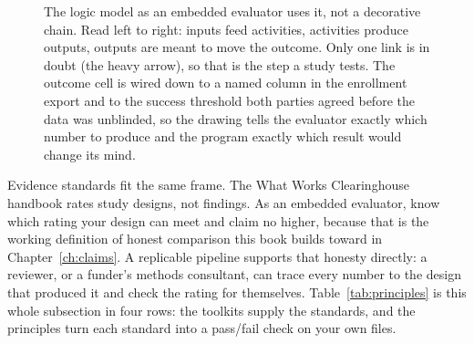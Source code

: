 \begin{figure}
\centering
{}
\caption[A logic model wired to a variable and a threshold]{The logic model as an embedded evaluator uses it, not a decorative chain. Read left to right: inputs feed activities, activities produce outputs, outputs are meant to move the outcome. Only one link is in doubt (the heavy arrow), so that is the step a study tests. The outcome cell is wired down to a named column in the enrollment export and to the success threshold both parties agreed before the data was unblinded, so the drawing tells the evaluator exactly which number to produce and the program exactly which result would change its mind.}
\label{fig:ch01-viz-logic}
\end{figure}

Evidence standards fit the same frame. The What Works Clearinghouse handbook \parencite{wwc2022handbook} rates study designs, not findings. As an embedded evaluator, know which rating your design can meet and claim no higher, because that is the working definition of honest comparison this book builds toward in Chapter~\ref{ch:claims}. A replicable pipeline supports that honesty directly: a reviewer, or a funder's methods consultant, can trace every number to the design that produced it and check the rating for themselves. Table~\ref{tab:principles} is this whole subsection in four rows: the toolkits supply the standards, and the principles turn each standard into a pass\slash fail check on your own files.

